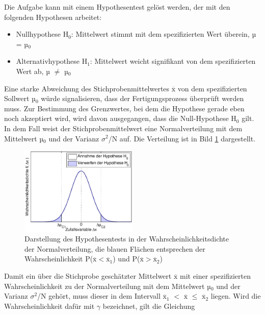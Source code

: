 \noindent Die Aufgabe kann mit einem Hypothesentest gel\"{o}st werden, der mit den folgenden Hypothesen arbeitet:

\begin{itemize}
    \item Nullhypothese H$_{0}$: Mittelwert stimmt mit dem spezifizierten Wert \"{u}berein, µ = µ$_{0}$
    \item Alternativhypothese H$_{1}$: Mittelwert weicht signifikant von dem spezifizierten Wert ab, µ $\neq$ µ$_{0}$
\end{itemize}

\noindent Eine starke Abweichung des Stichprobenmittelwertes $\overline{\mathrm{x}}$ von dem spezifizierten Sollwert µ$_{0}$ w\"{u}rde signalisieren, dass der Fertigungsprozess \"{u}berpr\"{u}ft werden muss. Zur Bestimmung des Grenzwertes, bei dem die Hypothese gerade eben noch akzeptiert wird, wird davon ausgegangen, dass die Null-Hypothese H$_{0}$ gilt. In dem Fall weist der Stichprobenmittelwert eine Normalverteilung mit dem Mittelwert µ$_{0}$ und der Varianz $\sigma^{2}$/N auf. Die Verteilung ist in Bild \ref{fig:DiagnoseFeuchtesensor1} dargestellt.

\clearpage

\noindent 
\begin{figure}[H]
  \centerline{\includegraphics[width=0.5\textwidth]{Kapitel6/Bilder/image1}}
  \caption{Darstellung des Hypothesentests in der Wahrscheinlichkeitsdichte der Normalverteilung, die blauen Fl\"{a}chen entsprechen der Wahrscheinlichkeit P($\overline{\mathrm{x}}\mathrm{<}{\overline{\mathrm{x}}}_1$) und P($\overline{\mathrm{x}} \mathrm{>}{\overline{\mathrm{x}}}_2$)}
  \label{fig:DiagnoseFeuchtesensor1}
\end{figure}

\noindent Damit ein \"{u}ber die Stichprobe gesch\"{a}tzter Mittelwert $\overline{\mathrm{x}}$ mit einer spezifizierten Wahrscheinlichkeit zu der Normalverteilung mit dem Mittelwert µ$_{0}$ und der Varianz $\sigma^{2}$/N geh\"{o}rt, muss dieser in dem Intervall ${\overline{\mathrm{x}}}_1$ $\mathrm{<}$ $\overline{\mathrm{x}}$ $\leq$ ${\overline{\mathrm{x}}}_2$ liegen. Wird die Wahrscheinlichkeit daf\"{u}r mit $\gamma$ bezeichnet, gilt die Gleichung

